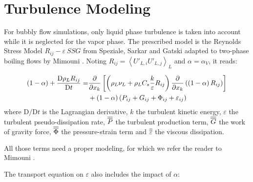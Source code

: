 
\section{Turbulence Modeling}
\label{subsec:turbulence}

%

For bubbly flow simulations, only liquid phase turbulence is taken into account while it is neglected for the vapor phase. The prescribed model is the Reynolds Stress Model $R_{ij}-\varepsilon~SSG$ from Speziale, Sarkar and Gatski \cite{speziale_modelling_1991} adapted to two-phase boiling flows by Mimouni \etal\cite{mimouni_combined_2011}. Noting $R_{ij} = \left< U'_{L,i}U'_{L,j} \right>_{L}$ and $\alpha = \alpha_{V}$, it reads:

\begin{align}
\left( 1-\alpha \right)+\frac{\mathrm{D}\rho_{L}R_{ij}}{\mathrm{D}t}  = & \frac{\partial}{\partial x_{k}}\left[  \left( \rho_{L}\nu_{L} + \rho_{L}C_{s} \frac{k}{\varepsilon}R_{ij} \right) \frac{\partial}{\partial x_{k}}\left(  \left( 1-\alpha \right) R_{ij}  \right)  \right] \\
&+ \left( 1 - \alpha \right)\left( P_{ij} + G_{ij} + \Phi_{ij} + \varepsilon_{ij} \right)
\end{align}
where $\mathrm{D}/\mathrm{D}t$ is the Lagrangian derivative, $k$ the turbulent kinetic energy, $\varepsilon$ the turbulent pseudo-dissipation rate, $\overline{\overline{P}}$ the turbulent production term, $\overline{\overline{G}}$ the work of gravity force, $\overline{\overline{\Phi}}$ the pressure-strain term and $\overline{\overline{\varepsilon}}$ the viscous dissipation.

\npar

All those terms need a proper modeling, for which we refer the reader to Mimouni \etal \cite{mimouni_combined_2011}.

\npar

The transport equation on $\varepsilon$ also includes the impact of $\alpha$:


